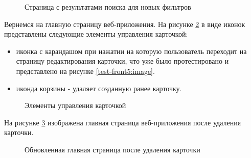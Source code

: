 \begin{figure}[H] %
\caption{Страница с результатами поиска для новых фильтров}
\label{test-front-21:image}
\end{figure}

Вернемся на главную страницу веб-приложения. На рисунке \ref{test-front-1:image} в виде иконок представлены следующие элементы управления карточкой:

\begin{itemize}
  \item иконка с карандашом при нажатии на которую пользователь переходит на страницу редактирования карточки, что уже было протестировано и представлено на рисунке \ref{test-front5:image}.
  \item иконда корзины -\- удаляет созданную ранее карточку.
\end{itemize}

\begin{figure}[H] %
  \caption{Элементы управления карточкой}
  \label{test-front-1:image}
\end{figure}

На рисунке \ref{test-front15:image} изображена главная страница веб-приложения после удаления карточки.

\begin{figure}[H] %
  \caption{Обновленная главная страница после удаления карточки}
  \label{test-front15:image}
\end{figure}
  